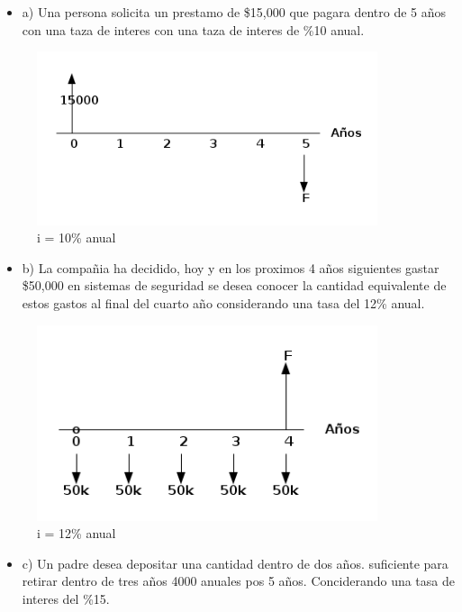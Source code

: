 \documentclass[11pt]{article}
\begin{document}
\begin{itemize}
\item a) Una persona solicita un prestamo de \$15,000 que pagara dentro de 5 años con una taza de interes con una taza de interes de \%10 anual.
\end{itemize}

\begin{figure}[htbp]
\centering
\includegraphics[width=10cm]{./img/incisoa.png}
\caption{i = 10\% anual}
\end{figure}


\begin{itemize}
\item b) La compañia ha decidido, hoy y en los proximos 4 años siguientes gastar \$50,000 en sistemas de seguridad se desea conocer la cantidad equivalente de estos gastos al final del cuarto año considerando una tasa del 12\% anual.
\end{itemize}

\begin{figure}[htbp]
\centering
\includegraphics[width=10cm]{./img/incisob.png}
\caption{i = 12\% anual}
\end{figure}


\begin{itemize}
\item c) Un padre desea depositar una cantidad dentro de dos años. suficiente para retirar dentro de tres años 4000 anuales pos 5 años. Conciderando una tasa de interes del \%15.
\end{itemize}
\end{document}
